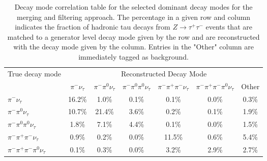 
\begin{table}[htp]
   \centering
   \begin{tabular}{l|cccccc}

\multirow{2}{*}{True decay mode} & \multicolumn{6}{c}{Reconstructed Decay Mode}\\

 & $\pi^{-}\nu_\tau$ & $\pi^{-}\pi^0\nu_\tau$ & $\pi^{-}\pi^0\pi^0\nu_\tau$ & $\pi^{-}\pi^{+}\pi^{-}\nu_\tau$ & $\pi^{-}\pi^{+}\pi^{-}\pi^0\nu_\tau$& Other \\
\hline
$\pi^{-}\nu_\tau$ & 16.2\% &1.0\% &0.1\% &0.1\% &0.0\% & 0.3\% \\
$\pi^{-}\pi^0\nu_\tau$ & 10.7\% &21.4\% &3.6\% &0.2\% &0.1\% & 1.9\% \\
$\pi^{-}\pi^0\pi^0\nu_\tau$ & 1.8\% &7.1\% &4.4\% &0.1\% &0.0\% & 1.5\% \\
$\pi^{-}\pi^{+}\pi^{-}\nu_\tau$ & 0.9\% &0.2\% &0.0\% &11.5\% &0.6\% & 5.4\% \\
$\pi^{-}\pi^{+}\pi^{-}\pi^0\nu_\tau$ & 0.1\% &0.3\% &0.0\% &3.2\% &2.9\% & 2.7\% \\

\end{tabular}
\label{tab:dmResolutionStandard}
\caption{Decay mode correlation table for the selected dominant decay modes
for the merging and filtering approach.  The percentage in a given row and column indicates
the fraction of hadronic tau decays from $Z\rightarrow\tau^{+}\tau^{-}$ events
that are matched to a generator level decay mode
given by the row and are reconstructed with the decay mode given by the column.
Entries in the "Other" column are immediately tagged as background.
}
\end{table}
